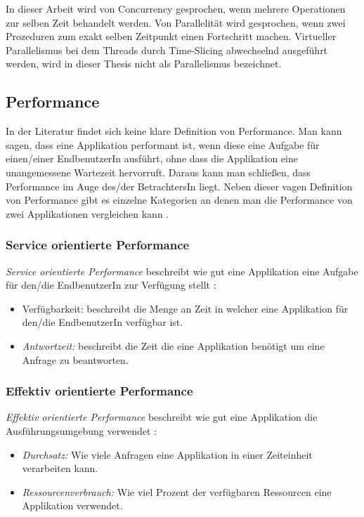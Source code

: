 In dieser Arbeit wird von Concurrency gesprochen, wenn mehrere Operationen zur selben Zeit behandelt werden.  Von Parallelität wird gesprochen, wenn zwei Prozeduren zum exakt selben Zeitpunkt einen Fortschritt machen. Virtueller Parallelismus bei dem Threads durch Time-Slicing abwechselnd ausgeführt werden, wird in dieser Thesis nicht als Parallelismus bezeichnet.

\subsection{Performance}

In der Literatur findet sich keine klare Definition von Performance. Man kann sagen, dass eine Applikation performant ist, wenn diese eine Aufgabe für einen/einer EndbenutzerIn ausführt, ohne dass die Applikation eine unangemessene Wartezeit hervorruft. Daraus kann man schließen, dass Performance im Auge des/der BetrachtersIn liegt. Neben dieser vagen Definition von Performance gibt es einzelne Kategorien an denen man die Performance von zwei Applikationen vergleichen kann \cite[p. 2]{Mol2009}. 

\subsubsection{Service orientierte Performance}

\emph{Service orientierte Performance} beschreibt wie gut eine Applikation eine Aufgabe für den/die EndbenutzerIn zur Verfügung stellt \cite[p. 2]{Mol2009}:

\begin{itemize}
  \item {Verfügbarkeit:} beschreibt die Menge an Zeit in welcher eine Applikation für den/die EndbenutzerIn verfügbar ist.
  \item \emph{Antwortzeit:} beschreibt die Zeit die eine Applikation benötigt um eine Anfrage zu beantworten.
\end{itemize}


\subsubsection{Effektiv orientierte Performance}

\emph{Effektiv orientierte Performance} beschreibt wie gut eine Applikation die Ausführungsumgebung verwendet \cite[p. 2]{Mol2009}:

\begin{itemize}
  \item \emph{Durchsatz:} Wie viele Anfragen eine Applikation in einer Zeiteinheit verarbeiten kann.
  \item \emph{Ressourcenverbrauch:} Wie viel Prozent der verfügbaren Ressourcen eine Applikation verwendet.
\end{itemize}


